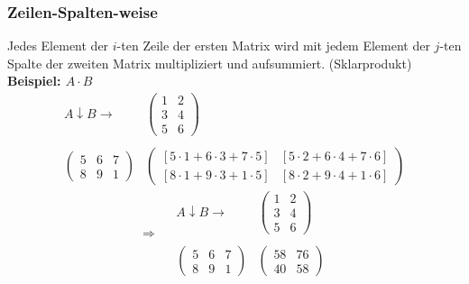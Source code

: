 \documentclass[12pt,a4paper]{article}
\begin{document}
\subsubsection{Zeilen-Spalten-weise}
Jedes Element der $i$-ten Zeile der ersten Matrix wird mit jedem Element der $j$-ten Spalte der zweiten Matrix multipliziert und aufsummiert. (Sklarprodukt) \\
\textbf{Beispiel: $A \cdot B$} \\
\[
\begin{matrix}
    A \downarrow B \rightarrow & \begin{pmatrix}
1 & 2 \\
3 & 4 \\
5 & 6
\end{pmatrix} \\ \\
\begin{pmatrix}
5 & 6 & 7\\
8 & 9 & 1
\end{pmatrix} & \begin{pmatrix}
[5 \cdot 1 + 6 \cdot 3 + 7 \cdot 5] & [5 \cdot 2 + 6 \cdot 4 + 7 \cdot 6] \\
[8 \cdot 1 + 9 \cdot 3 + 1 \cdot 5] & [8 \cdot 2 + 9 \cdot 4 + 1 \cdot 6]
\end{pmatrix}
\end{matrix}
\]
\[
\Rightarrow
\quad
\begin{matrix}
    A \downarrow B \rightarrow & \begin{pmatrix}
1 & 2 \\
3 & 4 \\
5 & 6
\end{pmatrix} \\ \\
\begin{pmatrix}
5 & 6 & 7\\
8 & 9 & 1
\end{pmatrix} & \begin{pmatrix}
    58 & 76 \\
    40 & 58
\end{pmatrix}
\end{matrix}
\]
\end{document}
